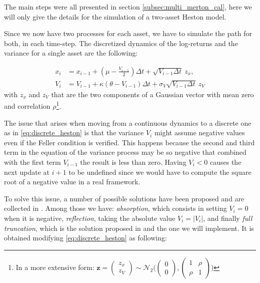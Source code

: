 The main steps were all presented in section \ref{subsec:multi_merton_cal}, here we will only give the details for the simulation of a two-asset Heston model.

Since we now have two processes for each asset, we have to simulate the path for both, in each time-step.
The discretized dynamics of the log-returns and the variance for a single asset are the following:

\begin{subequations}
	\label{eq:discrete_heston}
	\begin{align}
		x_i &= x_{i-1} + (\mu -  \frac{V_{i-1}}{2})\Delta t + \sqrt{V_{i-1} \Delta t} \:z_x, \\
		V_i &= V_{i-1} + \kappa(\theta - V_{i-1} )\Delta t + \sigma_V \sqrt{V_{i-1} \Delta t} \: z_V
	\end{align}
\end{subequations}
with $z_x$ and $z_V$ that are the two components of a Gaussian vector with mean zero and correlation $\rho$\footnote{In a more extensive form: $ \mathbf{z} = \begin{pmatrix}
	z_x\\ z_V
	\end{pmatrix} \sim \mathcal{N}_2 \Big(\begin{pmatrix}
	0\\ 0\end{pmatrix}, \begin{pmatrix}
	1& \rho\\ \rho&1
	\end{pmatrix} \Big)$}. 

The issue that arises when moving from a continuous dynamics to a discrete one as in \eqref{eq:discrete_heston} is that the variance $V_i$ might assume negative values even if the Feller condition is verified. This happens because the second and third term in the equation of the variance process may be so negative that combined with the first term $V_{i-1}$ the result is less than zero.
Having $V_i < 0$ causes the next update at $i+1$ to be undefined since we would have to compute the square root of a negative value in a real framework.

To solve this issue, a number of possible solutions have been proposed and are collected in \cite{LORD2010}. Among those we have:
\textit{absorption}, which consists in setting $V_i = 0$ when it is negative, \textit{reflection}, taking the absolute value $V_i = |V_i|$, and finally \textit{full truncation}, which is the solution proposed in \cite{LORD2010} and the one we will implement. It is obtained modifying \eqref{eq:discrete_heston} as following:

